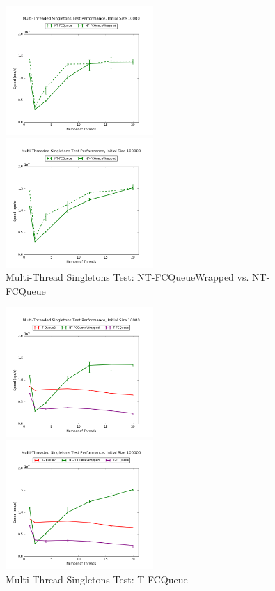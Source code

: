 \begin{figure}[H]
    \centering
    \includegraphics[width=0.5\textwidth]{fcqueues/ntQ:RandSingleOps10000.png}
    
    \includegraphics[width=0.5\textwidth]{fcqueues/ntQ:RandSingleOps100000.png}
    
\caption{Multi-Thread Singletons Test: NT-FCQueueWrapped vs. NT-FCQueue}
\label{fig:ntqueues}
\end{figure}

\begin{figure}[H]
    \centering
    \includegraphics[width=0.5\textwidth]{fcqueues/tQ:RandSingleOps10000.png}
    
    \includegraphics[width=0.5\textwidth]{fcqueues/tQ:RandSingleOps100000.png}
    
\caption{Multi-Thread Singletons Test: T-FCQueue}
\label{fig:tqueues}
\end{figure}

